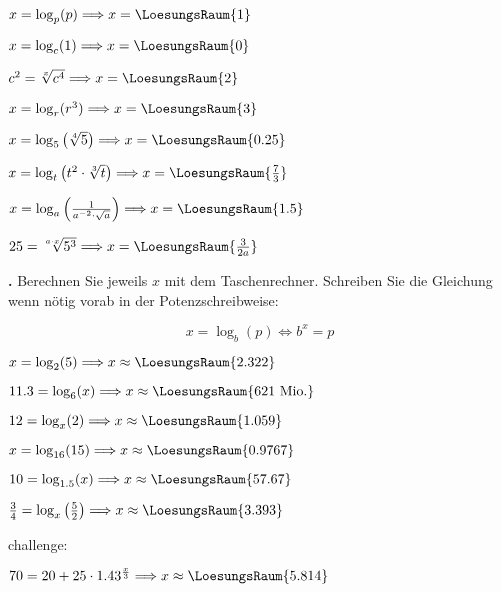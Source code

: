 \begin{bbwAufgabenBlock}
\item $x=\log_p(p) \Longrightarrow x =    \LoesungsRaum{1}$
\item $x=\log_c(1) \Longrightarrow x =    \LoesungsRaum{0}$
\item $c^2= \sqrt[x]{c^4} \Longrightarrow x =    \LoesungsRaum{2}$

\item $x=\log_r(r^3) \Longrightarrow x =    \LoesungsRaum{3}$
\item $x=\log_5\left(\sqrt[4]{5}\right) \Longrightarrow x =    \LoesungsRaum{0.25}$
\item $x=\log_t\left(t^2\cdot{}\sqrt[3]{t}\right) \Longrightarrow x =    \LoesungsRaum{\frac73}$
\seitenUmbruchImAufgabenteil{}
\item $x=\log_a\left( \frac1{a^{-2}\cdot{} \sqrt{a}} \right) \Longrightarrow x =    \LoesungsRaum{1.5}$
\item $25=\sqrt[a\cdot{}x]{5^3}  \Longrightarrow x =    \LoesungsRaum{\frac3{2a}}$

\end{bbwAufgabenBlock}


\newpage

\textbf{\bbwAufgabenNummer{}.}
Berechnen Sie jeweils $x$ mit dem Taschenrechner. Schreiben Sie die
Gleichung wenn nötig vorab in der Potenzschreibweise:

$$x=\log_b(p) \Longleftrightarrow b^x=p$$

\begin{bbwAufgabenBlock}
\item $x=\log_2(5) \Longrightarrow x \approx    \LoesungsRaum{2.322}$
\item $11.3 = \log_6(x) \Longrightarrow x \approx    \LoesungsRaum{621 \text{ Mio.}}$
\item $12 = \log_x(2) \Longrightarrow x \approx    \LoesungsRaum{1.059}$
\item $x = \log_{16}(15)  \Longrightarrow x \approx    \LoesungsRaum{0.9767}$
\item $10 = \log_{1.5}(x)  \Longrightarrow x \approx    \LoesungsRaum{57.67}$
\item $\frac34 = \log_{x}\left(\frac52\right)  \Longrightarrow x \approx    \LoesungsRaum{3.393}$\\

\noTRAINER{\newpage}

challenge:

\item $70=20 + 25 \cdot{} 1.43^{\frac{x}3}  \Longrightarrow x \approx    \LoesungsRaum{5.814}$

\end{bbwAufgabenBlock}

